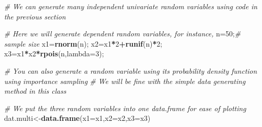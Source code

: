 \documentclass[12pt,]{book}
\newenvironment{Shaded}{\begin{snugshade}}{\end{snugshade}}
\newcommand{\KeywordTok}[1]{\textcolor[rgb]{0.13,0.29,0.53}{\textbf{#1}}}
\newcommand{\DataTypeTok}[1]{\textcolor[rgb]{0.13,0.29,0.53}{#1}}
\newcommand{\DecValTok}[1]{\textcolor[rgb]{0.00,0.00,0.81}{#1}}
\newcommand{\StringTok}[1]{\textcolor[rgb]{0.31,0.60,0.02}{#1}}
\newcommand{\CommentTok}[1]{\textcolor[rgb]{0.56,0.35,0.01}{\textit{#1}}}
\newcommand{\OperatorTok}[1]{\textcolor[rgb]{0.81,0.36,0.00}{\textbf{#1}}}
\newcommand{\NormalTok}[1]{#1}
\begin{document}
\begin{Shaded}
\begin{Highlighting}[]
\CommentTok{# We can generate many independent univariate random variables using code in the previous section }

\CommentTok{# Here we will generate dependent random variables, for instance, }
\NormalTok{n=}\DecValTok{50}\NormalTok{;}\CommentTok{# sample size}
\NormalTok{x1=}\KeywordTok{rnorm}\NormalTok{(n);}
\NormalTok{x2=x1}\OperatorTok{*}\DecValTok{2}\OperatorTok{+}\KeywordTok{runif}\NormalTok{(n)}\OperatorTok{*}\DecValTok{2}\NormalTok{;}
\NormalTok{x3=x1}\OperatorTok{*}\NormalTok{x2}\OperatorTok{*}\KeywordTok{rpois}\NormalTok{(n,}\DataTypeTok{lambda=}\DecValTok{3}\NormalTok{);}

\CommentTok{# You can also generate a random variable using its probability density function using importance sampling}
\CommentTok{# We will be fine with the simple data generating method in this class }

\CommentTok{# We put the three random variables into one data.frame for ease of plotting }
\NormalTok{dat.multi<-}\KeywordTok{data.frame}\NormalTok{(}\DataTypeTok{x1=}\NormalTok{x1,}\DataTypeTok{x2=}\NormalTok{x2,}\DataTypeTok{x3=}\NormalTok{x3)}
\end{Highlighting}
\end{Shaded}

\begin{Shaded}
\end{Shaded}


\end{document}
